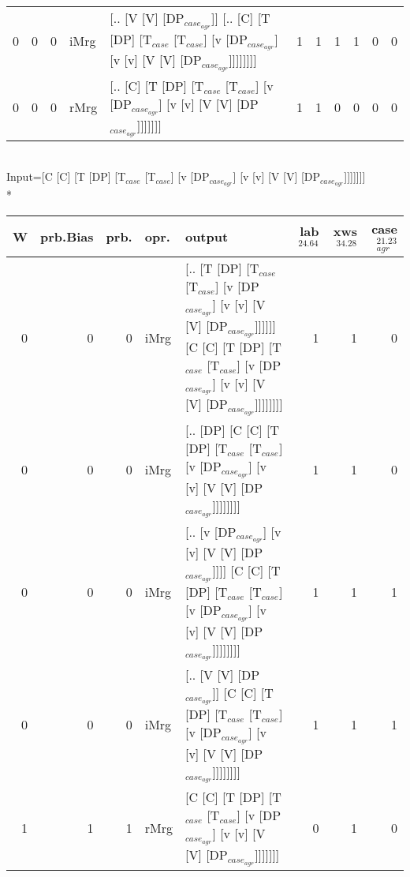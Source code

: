 \begin{tabularx}{\linewidth}{rrrlXrrrrrr}
   0 &       0 &   0 & iMrg & [.. [V [V] [DP$_{case_{agr}}$]] [.. [C] [T [DP] [T$_{case}$ [T$_{case}$] [v [DP$_{case_{agr}}$] [v [v] [V [V] [DP$_{case_{agr}}$]]]]]]]]                                                      &             1 &             1 &                  1 &            1 &              0 &             0 \\
   0 &       0 &   0 & rMrg & [.. [C] [T [DP] [T$_{case}$ [T$_{case}$] [v [DP$_{case_{agr}}$] [v [v] [V [V] [DP$_{case_{agr}}$]]]]]]]                                                                                 &             1 &             1 &                  0 &            0 &              0 &             0 \\
\hline
\end{tabularx}\endgroup\\
\begingroup\scriptsize Input=[C [C] [T [DP] [T$_{case}$ [T$_{case}$] [v [DP$_{case_{agr}}$] [v [v] [V [V] [DP$_{case_{agr}}$]]]]]]]\\*
\begin{tabularx}{\linewidth}{rrrlXrrr}
\hline
   W &   prb.Bias &   prb. & opr.   & output                                                                                                                                                             &   lab$^{24.64}$ &   xws$^{34.28}$ &   case$_{agr}^{21.23}$ \\
\hline
   0 &       0 &   0 & iMrg & [.. [T [DP] [T$_{case}$ [T$_{case}$] [v [DP$_{case_{agr}}$] [v [v] [V [V] [DP$_{case_{agr}}$]]]]]] [C [C] [T [DP] [T$_{case}$ [T$_{case}$] [v [DP$_{case_{agr}}$] [v [v] [V [V] [DP$_{case_{agr}}$]]]]]]]] &             1 &             1 &                  0 \\
   0 &       0 &   0 & iMrg & [.. [DP] [C [C] [T [DP] [T$_{case}$ [T$_{case}$] [v [DP$_{case_{agr}}$] [v [v] [V [V] [DP$_{case_{agr}}$]]]]]]]]                                                                       &             1 &             1 &                  0 \\
   0 &       0 &   0 & iMrg & [.. [v [DP$_{case_{agr}}$] [v [v] [V [V] [DP$_{case_{agr}}$]]]] [C [C] [T [DP] [T$_{case}$ [T$_{case}$] [v [DP$_{case_{agr}}$] [v [v] [V [V] [DP$_{case_{agr}}$]]]]]]]]                            &             1 &             1 &                  1 \\
   0 &       0 &   0 & iMrg & [.. [V [V] [DP$_{case_{agr}}$]] [C [C] [T [DP] [T$_{case}$ [T$_{case}$] [v [DP$_{case_{agr}}$] [v [v] [V [V] [DP$_{case_{agr}}$]]]]]]]]                                                      &             1 &             1 &                  1 \\
   1 &       1 &   1 & rMrg & [C [C] [T [DP] [T$_{case}$ [T$_{case}$] [v [DP$_{case_{agr}}$] [v [v] [V [V] [DP$_{case_{agr}}$]]]]]]]                                                                                 &             0 &             1 &                  0 \\
\hline
\end{tabularx}\endgroup\\
